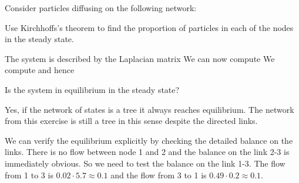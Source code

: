 Consider particles diffusing on the following network: 

\subquestion Use Kirchhoffs's theorem to find the proportion of particles in each of the nodes in the steady state. 

\solution
The system is described by the Laplacian matrix
We can now compute 
We compute 
and hence 

\subquestion Is the system in equilibrium in the steady state? 

\solution
Yes, if the network of states is a tree it always reaches equilibrium. 
The network from this exercise is still a tree in this sense despite the 
directed links. 

We can verify the equilibrium explicitly by checking the detailed balance on the links. There is no flow between node 1 and 2 and the balance on the link 2-3 is immediately obvious. So we need to test the balance on the link 1-3. The flow from 1 to 3 is $0.02\cdot 5.7 \approx 0.1$ and the flow from 3 to 1 is $0.49\cdot0.2 \approx 0.1$. 